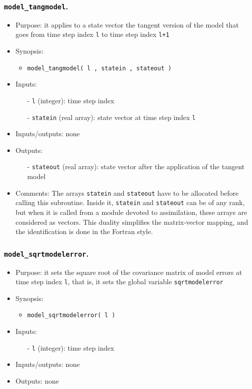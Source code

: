 \documentclass[12pt]{article}
\begin{document}
\subsubsection{{\tt model\_tangmodel}.}
\begin{itemize}
\item Purpose: it applies to a state vector the tangent version of the model that goes from time step index {\tt l} to time step index {\tt l+1}
\item Synopsis: 
\begin{itemize}
\item {\tt model\_tangmodel( l , statein , stateout )}
\end{itemize}
\item Inputs: 
\begin{itemize}
\item[-] {\tt l} (integer): time step index
\item[-] {\tt statein} (real array): state vector at time step index {\tt l} 
\end{itemize}
\item Inputs/outputs: none
\item Outputs: 
\begin{itemize}
\item[-] {\tt stateout} (real array): state vector after the application of the tangent model
\end{itemize}
\item Comments: The arrays {\tt statein} and {\tt stateout} have to be allocated before calling this subroutine. Inside it, {\tt statein} and {\tt stateout} can be of any rank, but when it is called from a module devoted to assimilation, these arrays are considered as vectors. This duality simplifies the matrix-vector mapping, and the identification is done in the Fortran style. 
\end{itemize} 

\subsubsection{{\tt model\_sqrtmodelerror}.}
\begin{itemize}
\item Purpose: it sets the square root of the covariance matrix of model errors at time step index {\tt l}, that is, it sets the global variable {\tt sqrtmodelerror}
\item Synopsis: 
\begin{itemize}
\item {\tt model\_sqrtmodelerror( l )}
\end{itemize}
\item Inputs: 
\begin{itemize}
\item[-] {\tt l} (integer): time step index
\end{itemize}
\item Inputs/outputs: none
\item Outputs: none
\end{itemize} 
\end{document}
